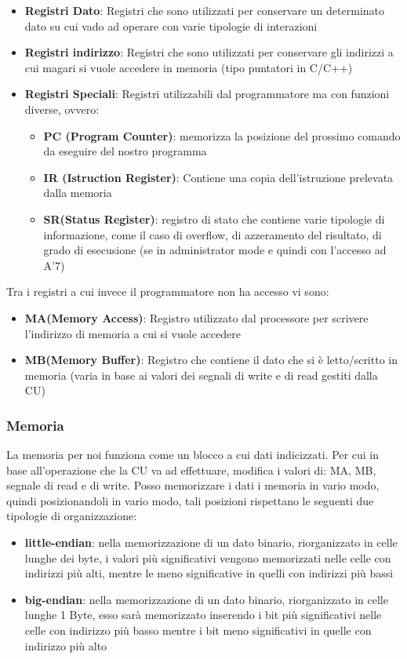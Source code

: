 \begin{itemize}
    \item \textbf{Registri Dato}: Registri che sono utilizzati per conservare un determinato dato su cui vado ad operare con varie tipologie di interazioni
    \item \textbf{Registri indirizzo}: Registri che sono utilizzati per conservare gli indirizzi a cui magari si vuole accedere in memoria (tipo puntatori in C/C++)
    \item \textbf{Registri Speciali}: Registri utilizzabili dal programmatore ma con funzioni diverse, ovvero:
    \begin{itemize}
        \item \textbf{PC (Program Counter)}: memorizza la posizione del prossimo comando da eseguire del nostro programma
        \item \textbf{IR (Istruction Register)}: Contiene una copia dell'istruzione prelevata dalla memoria 
        \item \textbf{SR(Status Register)}: registro di stato che contiene varie tipologie di informazione, come il caso di overflow, di azzeramento del risultato, di grado di esecusione (se in administrator mode e quindi con l'accesso ad A'7)
    \end{itemize}
\end{itemize}

Tra i registri a cui invece il programmatore non ha accesso vi sono:
\begin{itemize}
    \item \textbf{MA(Memory Access)}: Registro utilizzato dal processore per scrivere l'indirizzo di memoria a cui si vuole accedere
    \item \textbf{MB(Memory Buffer)}: Registro che contiene il dato che si è letto/scritto in memoria (varia in base ai valori dei segnali di write e di read gestiti dalla CU)
\end{itemize}

\subsubsection{Memoria}
La memoria per noi funziona come un blocco a cui dati indicizzati. Per cui in base all'operazione che la CU va ad effettuare, modifica i valori di: MA, MB, segnale di read e di write.
Posso memorizzare i dati i memoria in vario modo, quindi posizionandoli in vario modo, tali posizioni rispettano le seguenti due tipologie di organizzazione:
\begin{itemize}
    \item \textbf{little-endian}: nella memorizzazione di un dato binario, riorganizzato in celle lunghe dei byte, i valori più significativi vengono memorizzati nelle celle con indirizzi più alti, mentre le meno significative in quelli con indirizzi più bassi
    \item \textbf{big-endian}: nella memorizzazione di un dato binario, riorganizzato in celle lunghe 1 Byte, esso sarà memorizzato inserendo i bit più significativi nelle celle con indirizzo più basso mentre i bit meno significativi in quelle con indirizzo più alto
\end{itemize}

